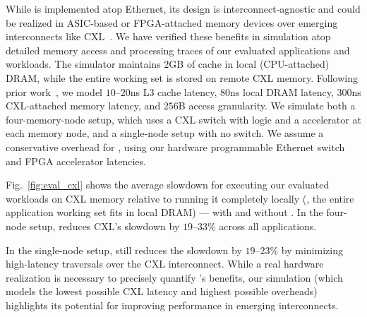 While \pulse is implemented atop Ethernet, its design is interconnect-agnostic and could be realized in ASIC-based or FPGA-attached memory devices over emerging interconnects like CXL~\cite{cxl, cxl_azure, sun2023demystifying}. We have verified these benefits in simulation atop detailed memory access and processing traces of our evaluated applications and workloads. The simulator maintains $2$GB of cache in local (CPU-attached) DRAM, while the entire working set is stored on remote CXL memory. Following prior work~\cite{pond}, we model $10$--$20$ns L3 cache latency, $80$ns local DRAM latency, $300$ns CXL-attached memory latency, and $256$B access granularity. We simulate both a four-memory-node setup, which uses a CXL switch with \pulse logic and a \pulse accelerator at each memory node, and a single-node setup with no switch. We assume a conservative overhead for \pulse, using our hardware programmable Ethernet switch and FPGA accelerator latencies.
 
 
Fig.~\ref{fig:eval_cxl} shows the average slowdown for executing our evaluated workloads on CXL memory relative to running it completely locally (\ie, the entire application working set fits in local DRAM) --- with and without \pulse. In the four-node setup, \pulse reduces CXL's slowdown by $19$--$33$\% across all applications. 

In the single-node setup, \pulse still reduces the slowdown by $19$--$23$\% by minimizing high-latency traversals over the CXL interconnect. While a real hardware realization is necessary to precisely quantify \pulse's benefits, our simulation (which models the lowest possible CXL latency and highest possible \pulse overheads) highlights its potential for improving performance in emerging interconnects.
